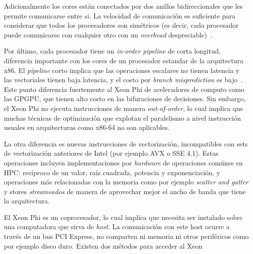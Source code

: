 Adicionalmente los cores est\'an conectados por dos anillos bidireccionales que les permite comunicarse entre si. La velocidad de
comunicaci\'on es suficiente para considerar que todos los procesadores son sim\'etricos (es decir, cada procesador puede comunicarse con
cualquier otro con un \textit{overhead} despreciable)~\cite{Fang}.

Por \'ultimo, cada procesador tiene un \textit{in-order pipeline} de corta longitud, diferencia importante con los cores de un procesador
estandar de la arquitectura x86. El \textit{pipeline} corto implica que las operaciones escalares no tienen latencia y las vectoriales tienen baja latencia,
y el costo por \textit{branch misprediction} es bajo~\cite{IntelXeonWhitePaper}. Este punto diferencia fuertemente al Xeon Phi de aceleradores de computo como las GPGPU, 
que tienen alto costo en las bifuraciones de decisiones. Sin embargo, el Xeon Phi no ejecuta instrucciones de manera \textit{out-of-order}, lo cual implica que muchas 
t\'ecnicas de optimizaci\'on que explotan el paralelismo a nivel instrucci\'on usuales en arquitecturas como x86-64 no son aplicables.

La otra diferencia es nuevas instrucciones de vectorizaci\'on, incompatibles con sets de vectorizaci\'on anteriores de Intel (por ejemplo AVX o SSE 4.1).
Estas operaciones incluyen implementaciones por \textit{hardware} de operaciones com\'unes en HPC: rec\'iproco de un valor, ra\'iz cuadrada, potencia y
exponenciaci\'on, y operaciones m\'as relacionadas con la memoria como por ejemplo \textit{scatter and gatter} y stores \textit{streameados} de manera de aprovechar
mejor el ancho de banda que tiene la arquitectura.

El Xeon Phi es un coprocesador, lo cual implica que necesita ser instalado sobre una computadora que sirva de \textit{host}. La comunicaci\'on con este host
ocurre a trav\'es de un bus PCI Express, no comparten ni memoria ni otros perif\'ericos como por ejemplo disco duro. Existen dos m\'etodos para acceder al Xeon~\cite{BookXeonPhi}

